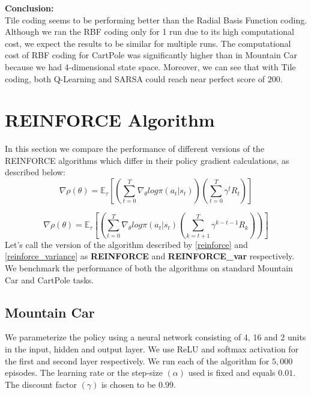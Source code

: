 \documentclass{article}
\begin{document}
        \noindent %
        \textbf{Conclusion:} \\
        Tile coding seems to be performing better than the Radial Basis Function coding. Although we ran the RBF coding 
        only for 1 run due to its high computational cost, we expect the results to be similar for multiple runs. The 
        computational cost of RBF coding for CartPole was significantly higher than in Mountain Car because we had 4-dimensional state space.
        Moreover, we can see that with Tile coding, both Q-Learning and SARSA could reach near perfect score of $200$.  

\section{REINFORCE Algorithm}
    In this section we compare the performance
    of different versions of the REINFORCE algorithms which differ in their policy gradient calculations, as described below:
    \begin{equation}
        \nabla \rho(\theta) = \mathbb{E}_{\tau} \left [\left ( \sum_{t=0}^{T} \nabla_{\theta} log \pi (a_{t} | s_{t}) \right) \left ( \sum_{t=0}^{T} \gamma^{t} R_{t} \right) \right ]
    \label{reinforce}
    \end{equation}

    \begin{equation}
        \nabla \rho(\theta) = \mathbb{E}_{\tau} \left [\left ( \sum_{t=0}^{T} \nabla_{\theta} log \pi (a_{t} | s_{t}) \left ( \sum_{k=t+1}^{T} \gamma^{k-t-1} R_{k} \right) \right) \right ]
    \label{reinforce_variance}
    \end{equation}
    Let's call the version of the algorithm described by \ref{reinforce} and \ref{reinforce_variance} as \textbf{REINFORCE} and \textbf{REINFORCE\_var} respectively.
    We benchmark the performance of both the algorithms on standard Mountain Car and CartPole tasks. 

    \subsection{Mountain Car}
    We parameterize the policy using a neural network consisting of 4, 16 and 2 units in the input, hidden and output layer. We use ReLU and softmax activation for
    the first and second layer respectively. We run each of the algorithm for $5,000$ episodes. 
    The learning rate or the step-size $(\alpha)$ used is fixed and equals $0.01$. The discount factor $(\gamma)$ is chosen to be $0.99$. \par
\end{document}
